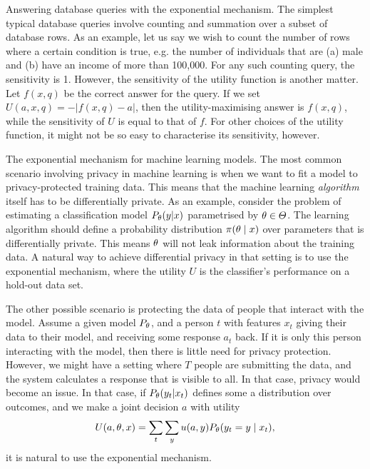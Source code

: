 \begin{exampleblock}{Answering database queries with the exponential mechanism.}
  The simplest typical database queries involve counting and summation over a subset of database rows. As an example, let us say we wish to count the number of rows where a certain condition is true, e.g. the number of individuals that are (a) male  and (b) have an income of more than 100,000. For any such counting query, the sensitivity is 1. However, the sensitivity of the utility function is another matter. Let $f(x,q)$ be the correct answer for the query. If we set $U(a,x,q) = -|f(x,q) - a|$, then the utility-maximising answer is $f(x,q)$, while the sensitivity of $U$ is equal to that of $f$. For other choices of the utility function, it might not be so easy to characterise its sensitivity, however.
\end{exampleblock}
\begin{exampleblock}{The exponential mechanism for machine learning models.}
  The most common scenario involving privacy in machine learning is  when we want to fit a model to privacy-protected training data. This means that the machine learning \emph{algorithm} itself has to be differentially private. As an example, consider the problem of estimating a classification model $P_\theta(y | x)$ parametrised by $\theta \in \Theta$. The learning algorithm should define a probability distribution $\pi(\theta \mid x)$ over parameters that is differentially private. This means $\theta$ will not leak information about the training data. A natural way to achieve differential privacy in that setting is to use the exponential mechanism, where the utility $U$ is the classifier's performance on a hold-out data set.

  The other possible scenario is protecting the data of people that interact with the model. Assume a given model $P_\theta$, and a person $t$ with features $x_t$ giving their data to their model, and receiving some response $a_t$ back. If it is only this person interacting with the model, then there is little need for privacy protection. However, we might have a setting where $T$ people are submitting the data, and the system calculates a response that is visible to all. In that case, privacy would become an issue. In that case, if $P_\theta(y_t | x_t)$ defines some a distribution over outcomes, and we make a joint decision $a$ with utility
  \[
    U(a, \theta, x) = \sum_t \sum_y u(a, y) P_\theta(y_t = y \mid x_t),
  \]
  it is natural to use the exponential mechanism.
\end{exampleblock}

